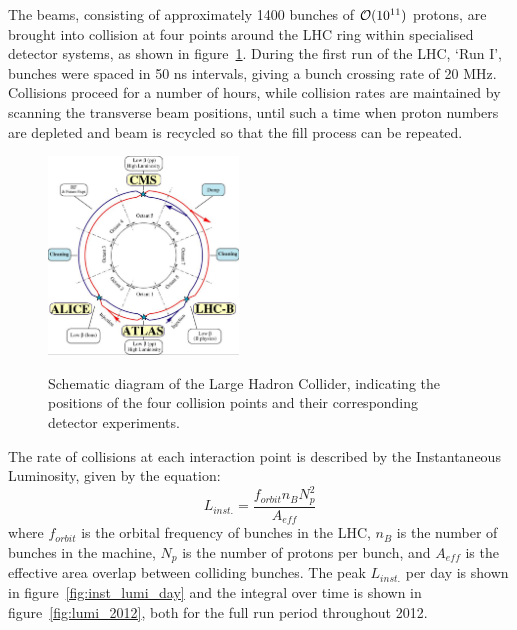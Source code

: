 The beams, consisting of approximately 1400 bunches of $\mathcal{O}(10^{11})$ protons,
are brought into collision
at four points around the LHC ring within specialised detector systems, as shown
in figure~\ref{fig:lhc_diagram}. During the
first run of the LHC, `Run I', bunches were spaced in 50 ns intervals, giving
a bunch crossing rate of 20 MHz. Collisions proceed for a number of hours, 
while collision rates are maintained by scanning the transverse beam positions, 
until such a time when proton numbers are depleted and beam is recycled so that 
the fill process can be repeated.

\begin{figure}[hb!]
\centering
\includegraphics[width=0.45\textwidth]{Figs/machine/lhc-schematic.jpg}
\label{fig:lhc_diagram}
\caption{Schematic diagram of the Large Hadron Collider, indicating the 
positions of the four collision points and their corresponding detector 
experiments.}
\end{figure}

The rate of collisions at each interaction point is described by the 
Instantaneous Luminosity, given by the equation:
% 
\begin{equation}
L_{inst.} = \frac{f_{orbit}n_{B}N_p^2}{A_{eff}}
\end{equation}
% 
where $f_{orbit}$ is the orbital frequency of bunches in the LHC, $n_B$ is the 
number of bunches in the machine, $N_p$ is the number of protons per bunch, and 
$A_{eff}$ is the effective area overlap between colliding bunches. The peak 
$L_{inst.}$ per day is shown in figure~\ref{fig:inst_lumi_day} and the integral
over time is shown in figure~\ref{fig:lumi_2012}, both for the full run period
throughout 2012.

